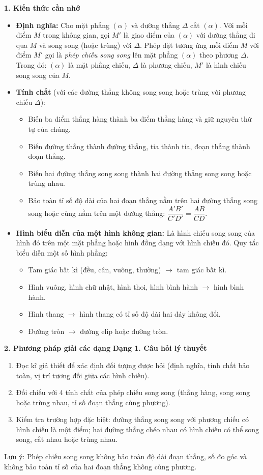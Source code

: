 \textbf{1. Kiến thức cần nhớ}
\begin{itemize}
\item \textbf{Định nghĩa:} Cho mặt phẳng $(\alpha)$ và đường thẳng $\Delta$ cắt $(\alpha)$. Với mỗi điểm $M$ trong không gian, gọi $M'$ là giao điểm của $(\alpha)$ với đường thẳng đi qua $M$ và song song (hoặc trùng) với $\Delta$. Phép đặt tương ứng mỗi điểm $M$ với điểm $M'$ gọi là \textit{phép chiếu song song} lên mặt phẳng $(\alpha)$ theo phương $\Delta$. Trong đó: $(\alpha)$ là mặt phẳng chiếu, $\Delta$ là phương chiếu, $M'$ là hình chiếu song song của $M$.
\item \textbf{Tính chất} (với các đường thẳng không song song hoặc trùng với phương chiếu $\Delta$):
  \begin{itemize}
  \item Biến ba điểm thẳng hàng thành ba điểm thẳng hàng và giữ nguyên thứ tự của chúng.
  \item Biến đường thẳng thành đường thẳng, tia thành tia, đoạn thẳng thành đoạn thẳng.
  \item Biến hai đường thẳng song song thành hai đường thẳng song song hoặc trùng nhau.
  \item Bảo toàn tỉ số độ dài của hai đoạn thẳng nằm trên hai đường thẳng song song hoặc cùng nằm trên một đường thẳng: $\boxed{\dfrac{A'B'}{C'D'} = \dfrac{AB}{CD}}$.
  \end{itemize}
\item \textbf{Hình biểu diễn của một hình không gian:} Là hình chiếu song song của hình đó trên một mặt phẳng hoặc hình đồng dạng với hình chiếu đó. Quy tắc biểu diễn một số hình phẳng:
  \begin{itemize}
  \item Tam giác bất kì (đều, cân, vuông, thường) $\to$ tam giác bất kì.
  \item Hình vuông, hình chữ nhật, hình thoi, hình bình hành $\to$ hình bình hành.
  \item Hình thang $\to$ hình thang có tỉ số độ dài hai đáy không đổi.
  \item Đường tròn $\to$ đường elip hoặc đường tròn.
  \end{itemize}
\end{itemize}

\textbf{2. Phương pháp giải các dạng}
\textbf{Dạng 1. Câu hỏi lý thuyết}
\begin{enumerate}
\item Đọc kĩ giả thiết để xác định đối tượng được hỏi (định nghĩa, tính chất bảo toàn, vị trí tương đối giữa các hình chiếu).
\item Đối chiếu với 4 tính chất của phép chiếu song song (thẳng hàng, song song hoặc trùng nhau, tỉ số đoạn thẳng cùng phương).
\item Kiểm tra trường hợp đặc biệt: đường thẳng song song với phương chiếu có hình chiếu là một điểm; hai đường thẳng chéo nhau có hình chiếu có thể song song, cắt nhau hoặc trùng nhau.
\end{enumerate}
Lưu ý: Phép chiếu song song không bảo toàn độ dài đoạn thẳng, số đo góc và không bảo toàn tỉ số của hai đoạn thẳng không cùng phương.

